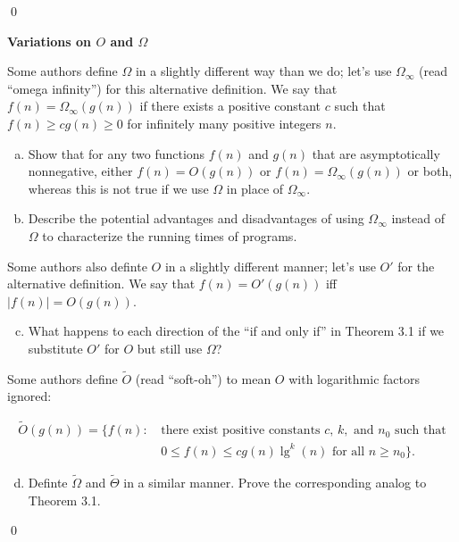 \sol \qed

 \textbf{Variations on $O$ and $\Omega$}

Some authors define $\Omega$ in a slightly different way than we do; let's use $\Omega_\infty$ (read ``omega infinity'') for this alternative definition. We say that $f(n) = \Omega_\infty(g(n))$ if there exists a positive constant $c$ such that $f(n) \geq cg(n) \geq 0$ for infinitely many positive integers $n$.

\begin{enumerate}[(a)]
    \item Show that for any two functions $f(n)$ and $g(n)$ that are asymptotically nonnegative, either $f(n) = O(g(n))$ or $f(n) = \Omega_\infty (g(n))$ or both, whereas this is not true if we use $\Omega$ in place of $\Omega_\infty$.
    \item Describe the potential advantages and disadvantages of using $\Omega_\infty$ instead of $\Omega$ to characterize the running times of programs.
\end{enumerate}

Some authors also definte $O$ in a slightly different manner; let's use $O'$ for the alternative definition. We say that $f(n) = O'(g(n))$ iff $|f(n)| = O(g(n))$.

\begin{enumerate}[(a)]
    \setcounter{enumi}{2}
    \item What happens to each direction of the ``if and only if'' in Theorem 3.1 if we substitute $O'$ for $O$ but still use $\Omega$?
\end{enumerate}

Some authors define $\tilde{O}$ (read ``soft-oh'') to mean $O$ with logarithmic factors ignored:

\begin{align*}
\tilde{O}(g(n)) = \{f(n) : \, & \text{there exist positive constants } c, \, k, \text{ and } n_0 \text{ such that} \\
& 0 \leq f(n) \leq cg(n) \lg^k (n) \text{ for all } n \geq n_0\}.
\end{align*}

\begin{enumerate}[(a)]
    \setcounter{enumi}{3}
    \item Definte $\tilde{\Omega}$ and $\tilde{\Theta}$ in a similar manner. Prove the corresponding analog to Theorem 3.1.
\end{enumerate}

\sol \qed

